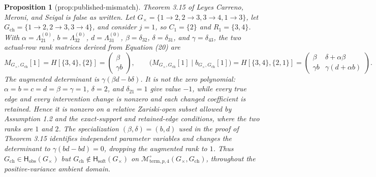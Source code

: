 \documentclass{article}
\newtheorem{proposition}{Proposition}
\begin{document}
\begin{proposition}[prop:published-mismatch]\label{prop:published-mismatch}
Theorem 3.15 of Leyes Carreno, Meroni, and Seigal is false as written. Let \(G_{\times}=\{1\to2,2\to3,3\to4,1\to3\}\), let \(G_{\mathrm{ch}}=\{1\to2,2\to3,3\to4\}\), and consider \(j=1\), so \(C_1=\{2\}\) and \(R_1=\{3,4\}\). With \(\alpha=\Lambda^{(0)}_{21}\), \(b=\Lambda^{(0)}_{32}\), \(d=\Lambda^{(0)}_{31}\), \(\beta=\delta_{32}\), \(\delta=\delta_{31}\), and \(\gamma=\delta_{43}\), the two actual-row rank matrices derived from Equation (20) are \[M_{G_{\times},G_{\mathrm{ch}}}[1]=H[\{3,4\},\{2\}]=\begin{pmatrix}\beta\\ \gamma b\end{pmatrix},\qquad \bigl(M_{G_{\times},G_{\mathrm{ch}}}[1]\mid b_{G_{\times},G_{\mathrm{ch}}}[1]\bigr)=H[\{3,4\},\{2,1\}]=\begin{pmatrix}\beta&\delta+\alpha\beta\\ \gamma b&\gamma(d+\alpha b)\end{pmatrix}.\] The augmented determinant is \(\gamma(\beta d-b\delta)\). It is not the zero polynomial: \(\alpha=b=c=d=\beta=\gamma=1\), \(\delta=2\), and \(\delta_{21}=1\) give value \(-1\), while every true edge and every intervention change is nonzero and each changed coefficient is retained. Hence it is nonzero on a relative Zariski-open subset allowed by Assumption 1.2 and the exact-support and retained-edge conditions, where the two ranks are \(1\) and \(2\). The specialization \((\beta,\delta)=(b,d)\) used in the proof of Theorem 3.15 identifies independent parameter variables and changes the determinant to \(\gamma(bd-bd)=0\), dropping the augmented rank to \(1\). Thus \(G_{\mathrm{ch}}\in\mathsf H_{\mathrm{obs}}(G_{\times})\) but \(G_{\mathrm{ch}}\notin\mathsf H_{\mathrm{soft}}(G_{\times})\) on \(\mathcal M^{\circ}_{\mathrm{term},p,4}(G_{\times},G_{\mathrm{ch}})\), throughout the positive-variance ambient domain.
\end{proposition}
\end{document}
